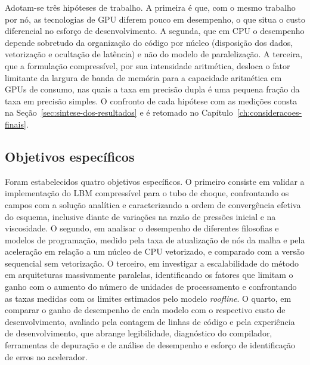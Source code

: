 Adotam-se três hipóteses de trabalho.
A primeira é que, com o mesmo trabalho por nó, as tecnologias de GPU diferem pouco em desempenho, o que situa o custo diferencial no esforço de desenvolvimento.
A segunda, que em CPU o desempenho depende sobretudo da organização do código por núcleo (disposição dos dados, vetorização e ocultação de latência) e não do modelo de paralelização.
A terceira, que a formulação compressível, por sua intensidade aritmética, desloca o fator limitante da largura de banda de memória para a capacidade aritmética em GPUs de consumo, nas quais a taxa em precisão dupla é uma pequena fração da taxa em precisão simples.
O confronto de cada hipótese com as medições consta na Seção~\ref{sec:sintese-dos-resultados} e é retomado no Capítulo~\ref{ch:consideracoes-finais}.


\subsection{Objetivos específicos}\label{subsec:objetivos-especificos}

Foram estabelecidos quatro objetivos específicos.
O primeiro consiste em validar a implementação do LBM compressível para o tubo de choque, confrontando os campos com a solução analítica e caracterizando a ordem de convergência efetiva do esquema, inclusive diante de variações na razão de pressões inicial e na viscosidade.
O segundo, em analisar o desempenho de diferentes filosofias e modelos de programação, medido pela taxa de atualização de nós da malha e pela aceleração em relação a um núcleo de CPU vetorizado, e comparado com a versão sequencial sem vetorização.
O terceiro, em investigar a escalabilidade do método em arquiteturas massivamente paralelas, identificando os fatores que limitam o ganho com o aumento do número de unidades de processamento e confrontando as taxas medidas com os limites estimados pelo modelo \textit{roofline}.
O quarto, em comparar o ganho de desempenho de cada modelo com o respectivo custo de desenvolvimento, avaliado pela contagem de linhas de código e pela experiência de desenvolvimento, que abrange legibilidade, diagnóstico do compilador, ferramentas de depuração e de análise de desempenho e esforço de identificação de erros no acelerador.


